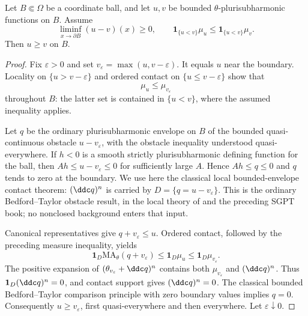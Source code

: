 \begin{lemma}\label{lem:big-local-comparison}
Let $B\Subset\Omega$ be a coordinate ball, and let $u,v$ be bounded $\theta$-plurisubharmonic functions on $B$. Assume
\[
 \liminf_{x\to\partial B}(u-v)(x)\geq0,
 \qquad \mathbf1_{\{u<v\}}\mu_u\leq
             \mathbf1_{\{u<v\}}\mu_v.
\]
Then $u\geq v$ on $B$.
\end{lemma}
\begin{proof}
Fix $\varepsilon>0$ and set $v_\varepsilon=\max(u,v-\varepsilon)$. It equals $u$ near the boundary. Locality on $\{u>v-\varepsilon\}$ and ordered contact on $\{u\leq v-\varepsilon\}$ show that
\[
 \mu_u\leq\mu_{v_\varepsilon}
\]
throughout $B$: the latter set is contained in $\{u<v\}$, where the assumed inequality applies.

Let $q$ be the ordinary plurisubharmonic envelope on $B$ of the bounded quasi-continuous obstacle $u-v_\varepsilon$, with the obstacle inequality understood quasi-everywhere. If $h<0$ is a smooth strictly plurisubharmonic defining function for the ball, then $Ah\leq u-v_\varepsilon\leq0$ for sufficiently large $A$. Hence $Ah\leq q\leq0$ and $q$ tends to zero at the boundary. We use here the classical local bounded-envelope contact theorem: $(\ddc q)^n$ is carried by $D=\{q=u-v_\varepsilon\}$. This is the ordinary Bedford--Taylor obstacle result, in the local theory of \cite{GZ17} and the preceding SGPT book; no nonclosed background enters that input.

Canonical representatives give $q+v_\varepsilon\leq u$. Ordered contact, followed by the preceding measure inequality, yields
\[
 \mathbf1_D\mathrm{MA}_\theta(q+v_\varepsilon)
 \leq\mathbf1_D\mu_u
 \leq\mathbf1_D\mu_{v_\varepsilon}.
\]
The positive expansion of $(\theta_{v_\varepsilon}+\ddc q)^n$ contains both $\mu_{v_\varepsilon}$ and $(\ddc q)^n$. Thus $\mathbf1_D(\ddc q)^n=0$, and contact support gives $(\ddc q)^n=0$. The classical bounded Bedford--Taylor comparison principle with zero boundary values implies $q=0$. Consequently $u\geq v_\varepsilon$, first quasi-everywhere and then everywhere. Let $\varepsilon\downarrow0$.
\end{proof}

